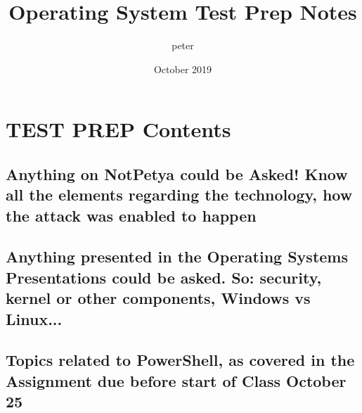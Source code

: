\documentclass{article}
\title{Operating System Test Prep Notes}
\author{peter }
\date{October 2019}
\begin{document}
\tableofcontents
\maketitle

\section{TEST PREP Contents}

\subsection{Anything on NotPetya could be Asked! Know all the elements regarding the technology, how the attack was enabled to happen}

\subsection{Anything presented in the Operating Systems Presentations could be asked. So:
security, kernel or other components, Windows vs Linux...}

\subsection{Topics related to PowerShell, as covered in the Assignment due before start of Class October 25}
\end{document}
